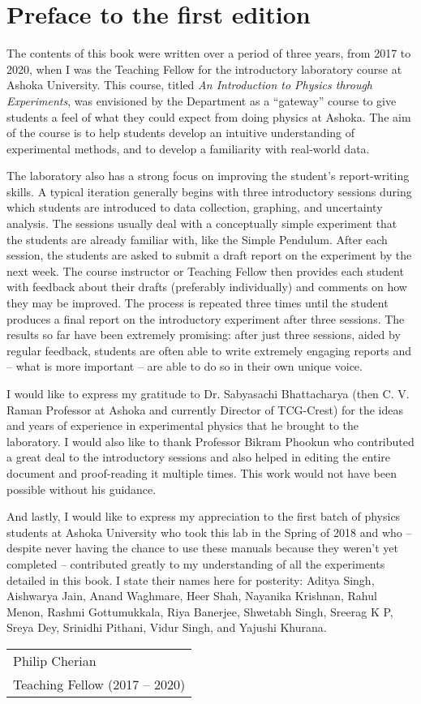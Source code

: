 \chapter*{Preface to the first edition}


The contents of this book were written over a period of three years, from 2017 to 2020, when I was the Teaching Fellow for the introductory laboratory course at Ashoka University. This course, titled \textit{An Introduction to Physics through Experiments}, was envisioned by the Department as a ``gateway'' course to give students a feel of what they could expect from doing physics at Ashoka. The aim of the course is to help students develop an intuitive understanding of experimental methods, and to develop a familiarity with real-world data.

The laboratory also has a strong focus on improving the student's report-writing skills. A typical iteration generally begins with three introductory sessions during which students are introduced to data collection, graphing, and uncertainty analysis. The sessions usually deal with a conceptually simple experiment that the students are already familiar with, like the Simple Pendulum. After each session, the students are asked to submit a draft report on the experiment by the next week. The course instructor or Teaching Fellow then provides each student with feedback about their drafts (preferably individually) and comments on how they may be improved. The process is repeated three times until the student produces a final report on the introductory experiment after three sessions. The results so far have been extremely promising: after just three sessions, aided by regular feedback, students are often able to write extremely engaging reports and -- what is more important -- are able to do so in their own unique voice.

I would like to express my gratitude to Dr. Sabyasachi Bhattacharya (then C. V. Raman Professor at Ashoka and currently Director of TCG-Crest) for the ideas and years of experience in experimental physics that he brought to the laboratory. I would also like to thank Professor Bikram Phookun who contributed a great deal to the introductory sessions and also helped in editing the entire document and proof-reading it multiple times. This work would not have been possible without his guidance. 

And lastly, I would like to express my appreciation to the first batch of physics students at Ashoka University who took this lab in the Spring of 2018 and who -- despite never having the chance to use these manuals because they weren't yet completed -- contributed greatly to my understanding of all the experiments detailed in this book. I state their names here for posterity: Aditya Singh, Aishwarya Jain, Anand Waghmare, Heer Shah, Nayanika Krishnan, Rahul Menon, Rashmi Gottumukkala, Riya Banerjee, Shwetabh Singh, Sreerag K P, Sreya Dey, Srinidhi Pithani, Vidur Singh, and Yajushi Khurana.




\hfill
\begin{tabular}{@{}l@{}}
Philip Cherian\\
Teaching Fellow (2017 -- 2020)
\end{tabular}
